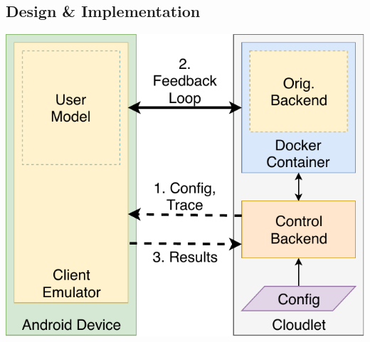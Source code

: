 \documentclass[portrait, a1]{KTHEEposter}
\begin{document}
\begin{pcolumns}[3]
\begin{pcolumn}[3]
\begin{pframe}[1.4]
                \section{Design \& Implementation}
                \begin{center}
                    \medskip
                    \includegraphics[width=\linewidth]{img/TraceReplay_GenArch}
                    \medskip
                \end{center}
                

\end{pframe}
\end{pcolumn}
\end{pcolumns}
\end{document}
